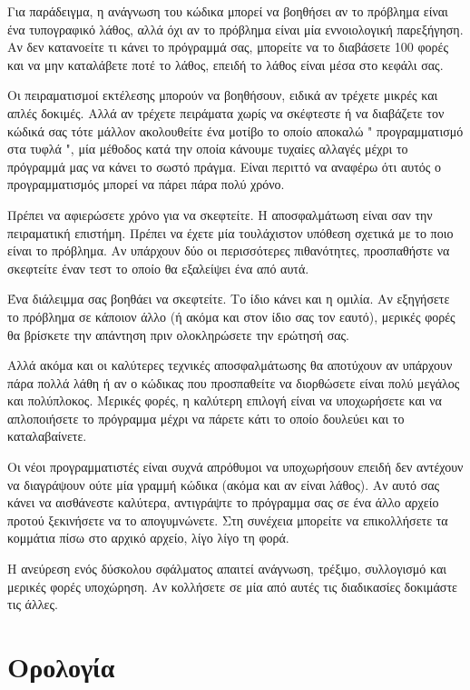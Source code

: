 \documentclass[10pt]{book}
\begin{document}
Για παράδειγμα, η ανάγνωση του κώδικα μπορεί να βοηθήσει αν το πρόβλημα είναι ένα τυπογραφικό λάθος, αλλά όχι αν το πρόβλημα είναι μία εννοιολογική παρεξήγηση. Αν δεν 
κατανοείτε τι κάνει το πρόγραμμά σας, μπορείτε να το διαβάσετε 100 φορές και να μην καταλάβετε ποτέ το λάθος, επειδή το λάθος είναι μέσα στο κεφάλι σας.

Οι πειραματισμοί εκτέλεσης μπορούν να βοηθήσουν, ειδικά αν τρέχετε μικρές και απλές δοκιμές. Αλλά αν τρέχετε πειράματα χωρίς να σκέφτεστε ή να διαβάζετε τον κώδικά σας 
τότε μάλλον ακολουθείτε ένα μοτίβο το οποίο αποκαλώ  " προγραμματισμό στα τυφλά ",  μία μέθοδος κατά την οποία κάνουμε τυχαίες αλλαγές μέχρι το 
πρόγραμμά μας να κάνει το σωστό πράγμα. Είναι περιττό να αναφέρω ότι αυτός ο  προγραμματισμός μπορεί να πάρει πάρα πολύ χρόνο.

Πρέπει να αφιερώσετε χρόνο για να σκεφτείτε. Η αποσφαλμάτωση είναι σαν την πειραματική επιστήμη. Πρέπει να έχετε μία τουλάχιστον υπόθεση σχετικά με το ποιο είναι το πρόβλημα. 
Αν υπάρχουν δύο οι περισσότερες πιθανότητες, προσπαθήστε να σκεφτείτε έναν τεστ το οποίο 
θα εξαλείψει ένα από αυτά.

Ένα διάλειμμα σας βοηθάει να σκεφτείτε. Το ίδιο κάνει και η ομιλία. Αν εξηγήσετε το πρόβλημα σε κάποιον άλλο (ή ακόμα και στον ίδιο σας τον εαυτό), μερικές φορές θα βρίσκετε 
την απάντηση πριν ολοκληρώσετε την ερώτησή σας.

Αλλά ακόμα και οι καλύτερες τεχνικές αποσφαλμάτωσης θα αποτύχουν αν υπάρχουν πάρα πολλά 
λάθη ή αν ο κώδικας που προσπαθείτε να διορθώσετε είναι πολύ μεγάλος και πολύπλοκος. Μερικές φορές, η καλύτερη επιλογή είναι να υποχωρήσετε και να απλοποιήσετε το πρόγραμμα μέχρι να πάρετε κάτι το οποίο δουλεύει και το καταλαβαίνετε.

Οι νέοι προγραμματιστές είναι συχνά απρόθυμοι να υποχωρήσουν επειδή δεν αντέχουν να 
διαγράψουν ούτε μία γραμμή κώδικα (ακόμα και αν είναι λάθος). Αν αυτό σας κάνει να αισθάνεστε καλύτερα, αντιγράψτε το πρόγραμμα σας σε ένα άλλο αρχείο προτού ξεκινήσετε 
να το απογυμνώνετε. Στη συνέχεια μπορείτε να επικολλήσετε τα κομμάτια πίσω στο αρχικό αρχείο, λίγο λίγο τη φορά.

Η ανεύρεση ενός δύσκολου σφάλματος απαιτεί ανάγνωση, τρέξιμο, συλλογισμό και μερικές φορές 
υποχώρηση. Αν κολλήσετε σε μία από αυτές τις διαδικασίες δοκιμάστε τις άλλες.


\section{Ορολογία}
\end{document}

